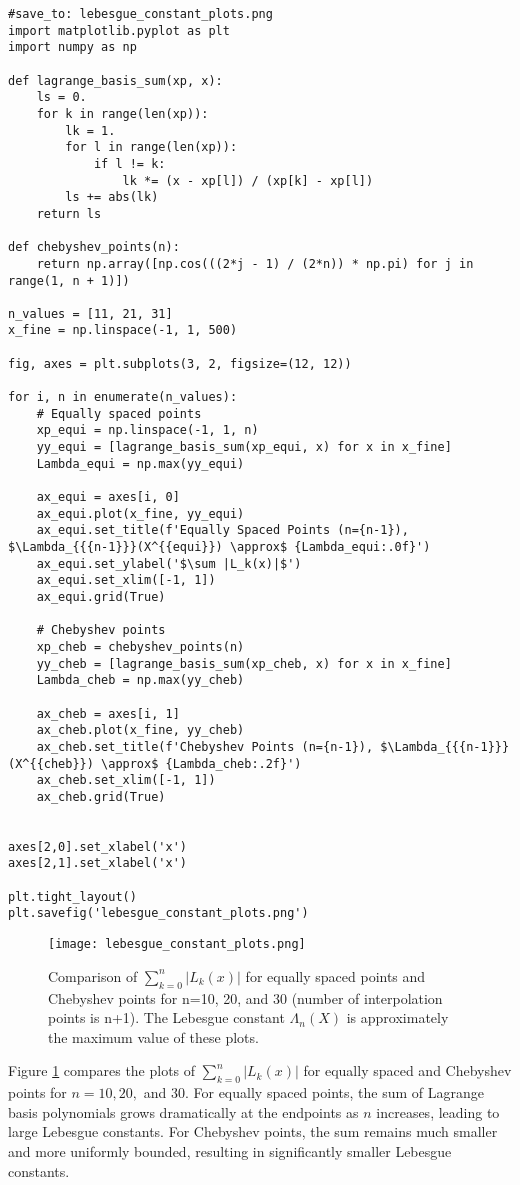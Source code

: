 \documentclass{article}
\begin{document}
\begin{verbatim}
#save_to: lebesgue_constant_plots.png
import matplotlib.pyplot as plt
import numpy as np

def lagrange_basis_sum(xp, x):
    ls = 0.
    for k in range(len(xp)):
        lk = 1.
        for l in range(len(xp)):
            if l != k:
                lk *= (x - xp[l]) / (xp[k] - xp[l])
        ls += abs(lk)
    return ls

def chebyshev_points(n):
    return np.array([np.cos(((2*j - 1) / (2*n)) * np.pi) for j in range(1, n + 1)])

n_values = [11, 21, 31]
x_fine = np.linspace(-1, 1, 500)

fig, axes = plt.subplots(3, 2, figsize=(12, 12))

for i, n in enumerate(n_values):
    # Equally spaced points
    xp_equi = np.linspace(-1, 1, n)
    yy_equi = [lagrange_basis_sum(xp_equi, x) for x in x_fine]
    Lambda_equi = np.max(yy_equi)

    ax_equi = axes[i, 0]
    ax_equi.plot(x_fine, yy_equi)
    ax_equi.set_title(f'Equally Spaced Points (n={n-1}), $\Lambda_{{{n-1}}}(X^{{equi}}) \approx$ {Lambda_equi:.0f}')
    ax_equi.set_ylabel('$\sum |L_k(x)|$')
    ax_equi.set_xlim([-1, 1])
    ax_equi.grid(True)

    # Chebyshev points
    xp_cheb = chebyshev_points(n)
    yy_cheb = [lagrange_basis_sum(xp_cheb, x) for x in x_fine]
    Lambda_cheb = np.max(yy_cheb)

    ax_cheb = axes[i, 1]
    ax_cheb.plot(x_fine, yy_cheb)
    ax_cheb.set_title(f'Chebyshev Points (n={n-1}), $\Lambda_{{{n-1}}}(X^{{cheb}}) \approx$ {Lambda_cheb:.2f}')
    ax_cheb.set_xlim([-1, 1])
    ax_cheb.grid(True)


axes[2,0].set_xlabel('x')
axes[2,1].set_xlabel('x')

plt.tight_layout()
plt.savefig('lebesgue_constant_plots.png')
\end{verbatim}

\begin{figure}[H]
    \centering
    \texttt{[image: lebesgue\_constant\_plots.png]}
    \caption{Comparison of $\sum_{k=0}^{n} |L_k(x)|$ for equally spaced points and Chebyshev points for n=10, 20, and 30 (number of interpolation points is n+1). The Lebesgue constant $\Lambda_n(X)$ is approximately the maximum value of these plots.}
    \label{fig:lebesgue_constant_comparison}
\end{figure}

Figure \ref{fig:lebesgue_constant_comparison} compares the plots of $\sum_{k=0}^{n} |L_k(x)|$ for equally spaced and Chebyshev points for $n=10, 20,$ and $30$. For equally spaced points, the sum of Lagrange basis polynomials grows dramatically at the endpoints as $n$ increases, leading to large Lebesgue constants. For Chebyshev points, the sum remains much smaller and more uniformly bounded, resulting in significantly smaller Lebesgue constants.
\end{document}
